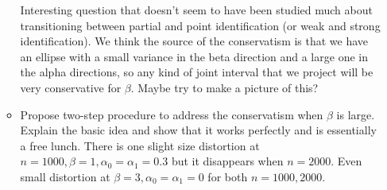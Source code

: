 \begin{itemize}
\begin{itemize}
        Interesting question that doesn't seem to have been studied much about transitioning between partial and point identification (or weak and strong identification).
        We think the source of the conservatism is that we have an ellipse with a small variance in the beta direction and a large one in the alpha directions, so any kind of joint interval that we project will be very conservative for $\beta$. Maybe try to make a picture of this?
      \item Propose two-step procedure to address the conservatism when $\beta$ is large. 
        Explain the basic idea and show that it works perfectly and is essentially a free lunch. 
        There is one slight size distortion at $n = 1000,\beta = 1, \alpha_0 = \alpha_1 = 0.3$ but it disappears when $n = 2000$. Even small distortion at $\beta = 3, \alpha_0 = \alpha_1 = 0$ for both $n =1000, 2000$.
    \end{itemize}
\end{itemize}
